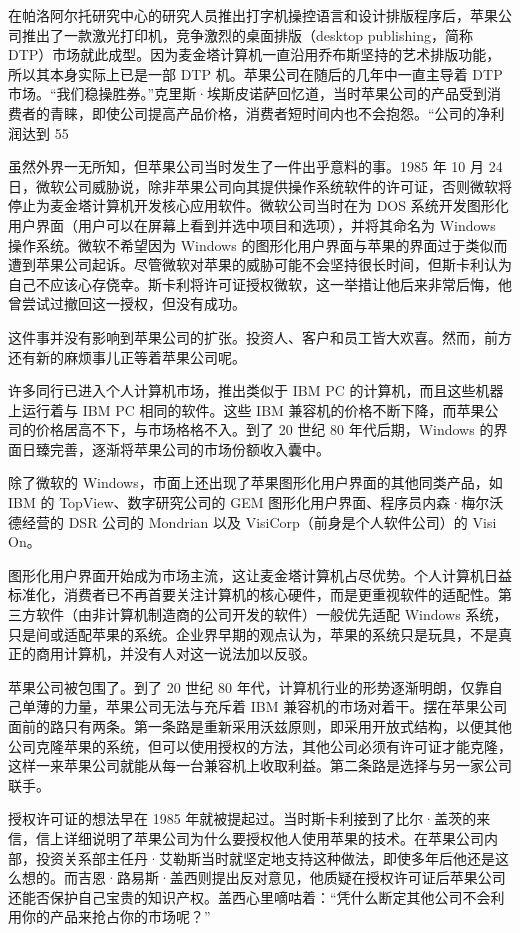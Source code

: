 \documentclass[12pt,UTF8]{ctexbook}
\begin{document}
在帕洛阿尔托研究中心的研究人员推出打字机操控语言和设计排版程序后，苹果公司推出了一款激光打印机，竞争激烈的桌面排版（desktop publishing，简称 DTP）市场就此成型。因为麦金塔计算机一直沿用乔布斯坚持的艺术排版功能，所以其本身实际上已是一部 DTP 机。苹果公司在随后的几年中一直主导着 DTP 市场。“我们稳操胜券。”克里斯·埃斯皮诺萨回忆道，当时苹果公司的产品受到消费者的青睐，即使公司提高产品价格，消费者短时间内也不会抱怨。“公司的净利润达到 55%

虽然外界一无所知，但苹果公司当时发生了一件出乎意料的事。1985 年 10 月 24 日，微软公司威胁说，除非苹果公司向其提供操作系统软件的许可证，否则微软将停止为麦金塔计算机开发核心应用软件。微软公司当时在为 DOS 系统开发图形化用户界面（用户可以在屏幕上看到并选中项目和选项），并将其命名为 Windows 操作系统。微软不希望因为 Windows 的图形化用户界面与苹果的界面过于类似而遭到苹果公司起诉。尽管微软对苹果的威胁可能不会坚持很长时间，但斯卡利认为自己不应该心存侥幸。斯卡利将许可证授权微软，这一举措让他后来非常后悔，他曾尝试过撤回这一授权，但没有成功。

这件事并没有影响到苹果公司的扩张。投资人、客户和员工皆大欢喜。然而，前方还有新的麻烦事儿正等着苹果公司呢。

许多同行已进入个人计算机市场，推出类似于 IBM PC 的计算机，而且这些机器上运行着与 IBM PC 相同的软件。这些 IBM 兼容机的价格不断下降，而苹果公司的价格居高不下，与市场格格不入。到了 20 世纪 80 年代后期，Windows 的界面日臻完善，逐渐将苹果公司的市场份额收入囊中。

除了微软的 Windows，市面上还出现了苹果图形化用户界面的其他同类产品，如 IBM 的 TopView、数字研究公司的 GEM 图形化用户界面、程序员内森·梅尔沃德经营的 DSR 公司的 Mondrian 以及 VisiCorp（前身是个人软件公司）的 Visi On。

图形化用户界面开始成为市场主流，这让麦金塔计算机占尽优势。个人计算机日益标准化，消费者已不再首要关注计算机的核心硬件，而是更重视软件的适配性。第三方软件（由非计算机制造商的公司开发的软件）一般优先适配 Windows 系统，只是间或适配苹果的系统。企业界早期的观点认为，苹果的系统只是玩具，不是真正的商用计算机，并没有人对这一说法加以反驳。

苹果公司被包围了。到了 20 世纪 80 年代，计算机行业的形势逐渐明朗，仅靠自己单薄的力量，苹果公司无法与充斥着 IBM 兼容机的市场对着干。摆在苹果公司面前的路只有两条。第一条路是重新采用沃兹原则，即采用开放式结构，以便其他公司克隆苹果的系统，但可以使用授权的方法，其他公司必须有许可证才能克隆，这样一来苹果公司就能从每一台兼容机上收取利益。第二条路是选择与另一家公司联手。

授权许可证的想法早在 1985 年就被提起过。当时斯卡利接到了比尔·盖茨的来信，信上详细说明了苹果公司为什么要授权他人使用苹果的技术。在苹果公司内部，投资关系部主任丹·艾勒斯当时就坚定地支持这种做法，即使多年后他还是这么想的。而吉恩·路易斯·盖西则提出反对意见，他质疑在授权许可证后苹果公司还能否保护自己宝贵的知识产权。盖西心里嘀咕着：“凭什么断定其他公司不会利用你的产品来抢占你的市场呢？”
\end{document}
